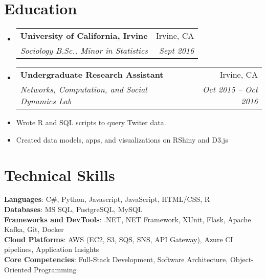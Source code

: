 \documentclass[letterpaper,11pt]{article}
\makeatletter
\newcommand{\resumeSubheading}[4]{
  \vspace{-2pt}\item
    \begin{tabular*}{0.97\textwidth}[t]{l@{\extracolsep{\fill}}r}
      \textbf{#1} & #2 \\
      \textit{\small#3} & \textit{\small #4} \\
    \end{tabular*}\vspace{-7pt}
}
\newcommand{\resumeSubHeadingListStart}{\begin{itemize}[leftmargin=0.15in, label={}]}
\newcommand{\resumeSubHeadingListEnd}{\end{itemize}}
\makeatother
\begin{document}
\section{Education}
  \resumeSubHeadingListStart
    \resumeSubheading
      {University of California, Irvine}{Irvine, CA}
      {Sociology B.Sc., Minor in Statistics}{Sept 2016}
      \resumeSubheading
      {Undergraduate Research Assistant}{Irvine, CA}
      {Networks, Computation, and Social Dynamics Lab}{Oct 2015 -- Oct 2016}
  \resumeSubHeadingListEnd

 \begin{itemize}[leftmargin=0.15in, label={}]
    \small{
    \item{
    \begin{itemize}
        \item{Wrote R and SQL scripts to query Twiter data.}
        \item{Created data models, apps, and visualizations on RShiny and D3.js}
    \end{itemize}
    }
    }
 \end{itemize}
 
\section{Technical Skills}
 \begin{itemize}[leftmargin=0.15in, label={}]
    \small{\item{
     \textbf{Languages}{: C\#, Python, Javascript, JavaScript, HTML/CSS, R} \\
     \textbf{Databases}{: MS SQL, PostgreSQL, MySQL} \\
     \textbf{Frameworks and DevTools}{: .NET, NET Framework, XUnit, Flask, Apache Kafka, Git, Docker} \\
     \textbf{Cloud Platforms}{: AWS (EC2, S3, SQS, SNS, API Gateway), Azure CI pipelines, Application Insights} \\
     \textbf{Core Competencies}{: Full-Stack Development, Software Architecture, Object-Oriented Programming}
    }}
 \end{itemize}


\end{document}
